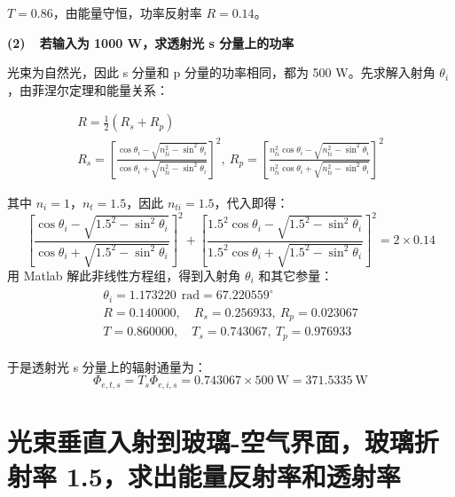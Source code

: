\documentclass[a4paper]{article}  %
\theoremstyle{MyLineTheoremStyle} %
\theoremstyle{MyBlockTheoremStyle} %
\theoremstyle{MySubsubsectionStyle} %
\begin{document}
\begin{multicols*}{4}
$T = 0.86$，由能量守恒，功率反射率 $R = 0.14$。

\textbf{(2)\ \ 若输入为 1000 W，求透射光 s 分量上的功率}

光束为自然光，因此 s 分量和 p 分量的功率相同，都为 500 W。先求解入射角 $\theta_i$，由菲涅尔定理和能量关系：

\begin{gather}
    R =  \frac{1}{2}(R_s + R_p) \\ 
    R_s =  \left[ \frac{ \cos \theta_i - \sqrt{n_{ti}^2 - \sin^2 \theta_i} }{\cos \theta_i + \sqrt{n_{ti}^2 - \sin^2 \theta_i}} \right]^2,\ R_p = \left[ \frac{ n_{ti}^2\cos \theta_i - \sqrt{n_{ti}^2 - \sin^2 \theta_i} }{n_{ti}^2\cos \theta_i + \sqrt{n_{ti}^2 - \sin^2 \theta_i}} \right]^2
\end{gather}


其中 $n_i = 1$，$n_t = 1.5$，因此 $n_{ti} = 1.5$，代入即得：
\begin{equation}
    \left[ \frac{ \cos \theta_i - \sqrt{1.5^2 - \sin^2 \theta_i} }{\cos \theta_i + \sqrt{1.5^2 - \sin^2 \theta_i}} \right]^2 + \left[ \frac{ 1.5^2\cos \theta_i - \sqrt{1.5^2 - \sin^2 \theta_i} }{1.5^2\cos \theta_i + \sqrt{1.5^2 - \sin^2 \theta_i}} \right]^2 = 2\times0.14
\end{equation}
用 Matlab 解此非线性方程组，得到入射角 $\theta_i$ 和其它参量：
\begin{gather}\label{解入射角}
\begin{matrix}
    \theta_i =  1.173220\ \ \mathrm{rad}  = 67.220559^\circ \\
    R = 0.140000,\quad   R_s = 0.256933,\    R_p = 0.023067 \\ 
    T = 0.860000,\quad   T_s = 0.743067,\    T_p = 0.976933
\end{matrix}
\end{gather}

于是透射光 s 分量上的辐射通量为：
\begin{equation}
\Phi_{e,t,s} = T_s \Phi_{e,i,s} = 0.743067 \times 500 \ \mathrm{W} =  371.5335 \ \mathrm{W}
\end{equation}


\section{光束垂直入射到玻璃-空气界面，玻璃折射率 1.5，求出能量反射率和透射率}


\end{multicols*}
\end{document}
